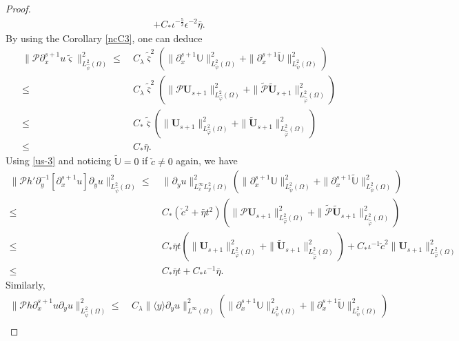 \documentclass{amsart}
\numberwithin{equation}{section}
\newcommand\y{{{\langle y \rangle}}}
\begin{document}
\begin{proof}
\begin{align}
     +C_{*}\iota^{-\frac{5}{2}}\epsilon^{-2}\bar{\eta}.\nonumber
\end{align}
By using the Corollary \ref{ncC3}, one can deduce
\begin{align}\label{pm14}
\|\mathcal{P}\partial_{x}^{s+1}u\tilde{\varsigma}\|_{L_{\hat{\psi}}^{2}(\Omega)}^{2}
\leq&~C_{\lambda}\tilde{\bar{\varsigma}}^{2}\left(\|\partial_{x}^{s+1}\mathbb{U}\|_{L_{\check{\psi}}^{2}(\Omega)}^{2}+\|\partial_{x}^{s+1}\tilde{\mathbb{U}}\|_{L_{\check{\psi}}^{2}(\Omega)}^{2}\right)\\
\leq&~C_{\lambda}\tilde{\bar{\varsigma}}^{2}\left(\|\mathcal{P}\mathbf{U}_{s+1}\|_{L_{\hat{\varphi}}^{2}(\Omega)}^{2}+\|\tilde{\mathcal{P}}\tilde{\mathbf{U}}_{s+1}\|_{L_{\tilde{\hat{\varphi}}}^{2}(\Omega)}^{2}\right)\nonumber\\
\leq&~C_{*}\tilde{\bar{\varsigma}}\left(\|\mathbf{U}_{s+1}\|_{L_{\hat{\varphi}}^{2}(\Omega)}^{2}+\|\tilde{\mathbf{U}}_{s+1}\|_{L_{\tilde{\hat{\varphi}}}^{2}(\Omega)}^{2}\right)\nonumber\\
\leq&~C_{*}\bar{\eta}.\nonumber
\end{align}
Using \eqref{us-3} and noticing $\tilde{\mathbb{U}}=0$ if $\check{c}\neq0$ again, we have
\begin{align*}
\|\mathcal{P}h'\partial_{y}^{-1}[\partial_{x}^{s+1}u]\partial_{y}u\|_{L_{\hat{\psi}}^{2}(\Omega)}^{2}
\leq&~\|\partial_{y}u\|_{L_{x}^{\infty}L_{y}^{2}(\Omega)}^{2}
      \left(\|\partial_{x}^{s+1}\mathbb{U}\|_{L_{\check{\psi}}^{2}(\Omega)}^{2}+\|\partial_{x}^{s+1}\tilde{\mathbb{U}}\|_{L_{\check{\psi}}^{2}(\Omega)}^{2}\right)\\
\leq&~C_{*}(\check{c}^{2}+\bar{\eta}t^{2})\left(\|\mathcal{P}\mathbf{U}_{s+1}\|_{L_{\hat{\varphi}}^{2}(\Omega)}^{2}+\|\tilde{\mathcal{P}}\tilde{\mathbf{U}}_{s+1}\|_{L_{\tilde{\hat{\varphi}}}^{2}(\Omega)}^{2}\right)\\
\leq&~C_{*}\bar{\eta}t\left(\|\mathbf{U}_{s+1}\|_{L_{\hat{\varphi}}^{2}(\Omega)}^{2}+\|\tilde{\mathbf{U}}_{s+1}\|_{L_{\tilde{\hat{\varphi}}}^{2}(\Omega)}^{2}\right)
     +C_{*}\iota^{-1}\check{c}^{2}\|\mathbf{U}_{s+1}\|_{L_{\hat{\varphi}}^{2}(\Omega)}^{2}\nonumber\\
\leq&~C_{*}\bar{\eta}t
     +C_{*}\iota^{-1}\bar{\eta}.
\end{align*}
Similarly,
\begin{align}\label{pm15}
\|\mathcal{P}h\partial_{x}^{s+1}u\partial_{y}u\|_{L_{\hat{\psi}}^{2}(\Omega)}^{2}
\leq&~C_{\lambda}\|\y\partial_{y}u\|_{L^{\infty}(\Omega)}^{2}
      \left(\|\partial_{x}^{s+1}\mathbb{U}\|_{L_{\check{\psi}}^{2}(\Omega)}^{2}+\|\partial_{x}^{s+1}\tilde{\mathbb{U}}\|_{L_{\check{\psi}}^{2}(\Omega)}^{2}\right)\\

\end{align}
\end{proof}
\end{document}
